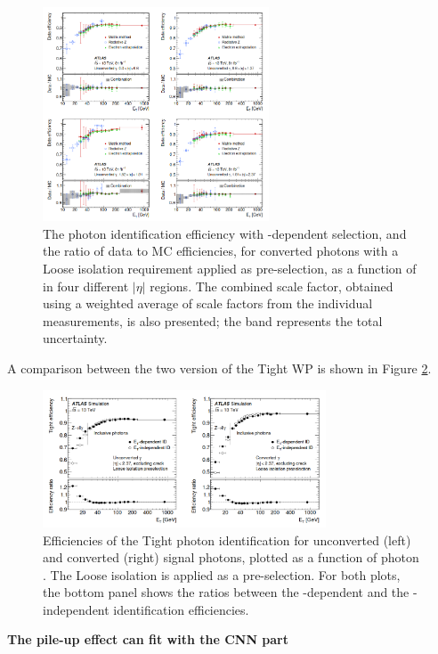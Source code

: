 \begin{figure}[ht]
    \centering
    \includegraphics[width=0.6\textwidth]{Ch3/Img/Unconverted_Eff_2017.png}
    \caption{The photon identification efficiency with \eT-dependent selection, and the ratio of data to MC efficiencies, for converted photons with a Loose isolation requirement applied as pre-selection, as a function of \eT in four different $|\eta|$ regions. The combined scale factor, obtained using a weighted average of scale factors from the individual measurements, is also presented; the band represents the total uncertainty.}
    \label{fig:gamma:ID:Eff:Cov}
\end{figure}
A comparison between the two version of the Tight WP is shown in Figure \ref{fig:gamma:ID:Eff:Tight}.
\begin{figure}[ht]
    \centering
    \includegraphics[width=0.75\textwidth]{Ch3/Img/Tight_ID.png}
    \caption{Efficiencies of the Tight photon identification for unconverted (left) and converted (right) signal photons, plotted as a function of photon \eT. The Loose isolation  is applied as a pre-selection. For both plots, the bottom panel shows the ratios between the \eT-dependent and the \eT-independent identification efficiencies.}
    \label{fig:gamma:ID:Eff:Tight}
\end{figure}
\textbf{The pile-up effect can fit with the CNN part}
